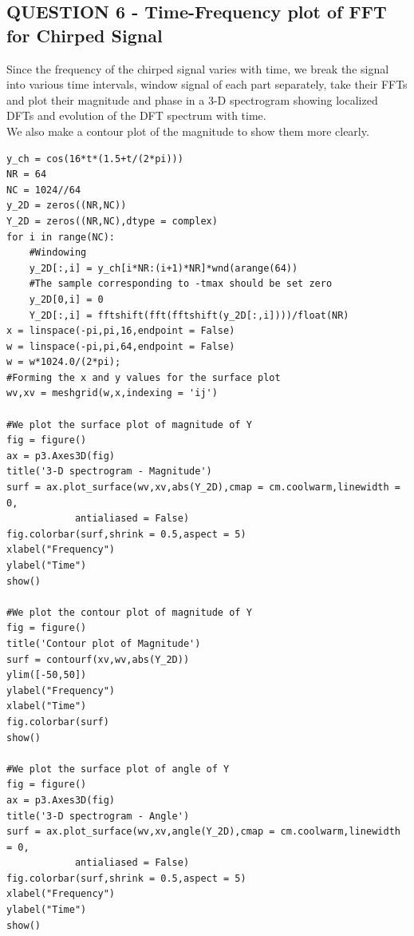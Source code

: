 \documentclass[11pt, a4paper]{article}
\begin{document}
\subsection{QUESTION 6 - Time-Frequency plot of FFT for Chirped Signal}
{
Since the frequency of the chirped signal varies with time, we break the signal into various time intervals, window signal of each part separately, take their FFTs and plot their magnitude and phase in a 3-D spectrogram showing localized DFTs and evolution of the DFT spectrum with time.
\\We also make a contour plot of the magnitude to show them more clearly.
}
\begin{verbatim}
y_ch = cos(16*t*(1.5+t/(2*pi)))
NR = 64
NC = 1024//64
y_2D = zeros((NR,NC))
Y_2D = zeros((NR,NC),dtype = complex)
for i in range(NC):
	#Windowing
	y_2D[:,i] = y_ch[i*NR:(i+1)*NR]*wnd(arange(64))
	#The sample corresponding to -tmax should be set zero
	y_2D[0,i] = 0
	Y_2D[:,i] = fftshift(fft(fftshift(y_2D[:,i])))/float(NR)
x = linspace(-pi,pi,16,endpoint = False)
w = linspace(-pi,pi,64,endpoint = False)
w = w*1024.0/(2*pi);
#Forming the x and y values for the surface plot
wv,xv = meshgrid(w,x,indexing = 'ij')

#We plot the surface plot of magnitude of Y
fig = figure()
ax = p3.Axes3D(fig)
title('3-D spectrogram - Magnitude')
surf = ax.plot_surface(wv,xv,abs(Y_2D),cmap = cm.coolwarm,linewidth = 0,
			antialiased = False)
fig.colorbar(surf,shrink = 0.5,aspect = 5)
xlabel("Frequency")
ylabel("Time")
show()

#We plot the contour plot of magnitude of Y
fig = figure()
title('Contour plot of Magnitude')
surf = contourf(xv,wv,abs(Y_2D))
ylim([-50,50])
ylabel("Frequency")
xlabel("Time")
fig.colorbar(surf)
show()

#We plot the surface plot of angle of Y
fig = figure()
ax = p3.Axes3D(fig)
title('3-D spectrogram - Angle')
surf = ax.plot_surface(wv,xv,angle(Y_2D),cmap = cm.coolwarm,linewidth = 0,
			antialiased = False)
fig.colorbar(surf,shrink = 0.5,aspect = 5)
xlabel("Frequency")
ylabel("Time")
show()
\end{verbatim}
\end{document}
